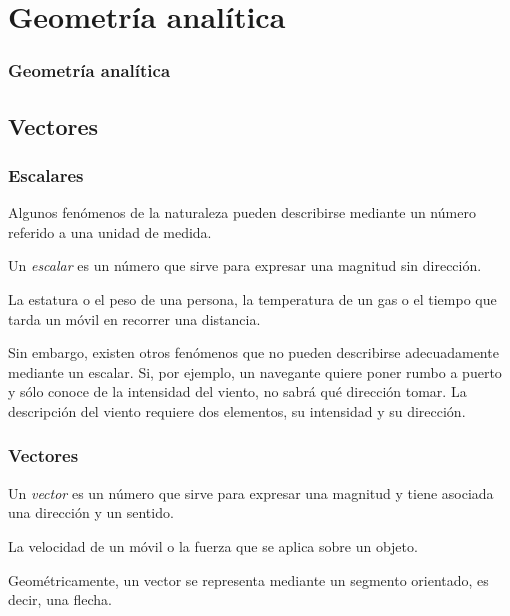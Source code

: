 \section{Geometría analítica}

\begin{frame}
\frametitle{Geometría analítica}
\setlength{\parskip}{0.3em}
\tableofcontents[sectionstyle=show/hide,hideothersubsections]
\end{frame}

\subsection{Vectores}

\begin{frame}
\frametitle{Escalares}
Algunos fenómenos de la naturaleza pueden describirse mediante un número referido a una unidad de medida. 

\begin{definicion}[Escalar]
Un \emph{escalar} es un número que sirve para expresar una magnitud sin dirección.
\end{definicion}
 La estatura o el peso de una persona, la temperatura de un gas o el tiempo que tarda un móvil en recorrer una distancia.

Sin embargo, existen otros fenómenos que no pueden describirse adecuadamente mediante un escalar. 
Si, por ejemplo, un navegante quiere poner rumbo a puerto y sólo conoce de la intensidad del viento, no sabrá qué dirección tomar. 
La descripción del viento requiere dos elementos, su intensidad y su dirección. 

\end{frame}


\begin{frame}
\frametitle{Vectores}
\begin{definicion}[Vector]
Un \emph{vector} es un número que sirve para expresar una magnitud y tiene asociada una dirección y un sentido. 
\end{definicion}

 La velocidad de un móvil o la fuerza que se aplica sobre un objeto.  
 
Geométricamente, un vector se representa mediante un segmento orientado, es decir, una flecha.  
\begin{center}
\scalebox{0.8}{}
\end{center}
\end{frame}


